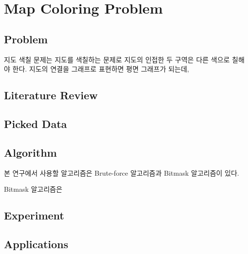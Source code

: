 \documentclass{sig-alternate-05-2015}
\begin{document}
\section{Map Coloring Problem}
\begin{CJK}{UTF8}{mj}
\subsection{Problem}
지도 색칠 문제는 지도를 색칠하는 문제로 지도의 인접한 두 구역은 다른 색으로 칠해야 한다. 지도의 연결을 그래프로 표현하면 평면 그래프가 되는데, 
\subsection{Literature Review}
\subsection{Picked Data}
\subsection{Algorithm}
본 연구에서 사용할 알고리즘은 Brute-force 알고리즘과 Bitmask 알고리즘이 있다.

Bitmask 알고리즘은 
\subsection{Experiment}
\subsection{Applications}
\end{CJK}
\end{document}
